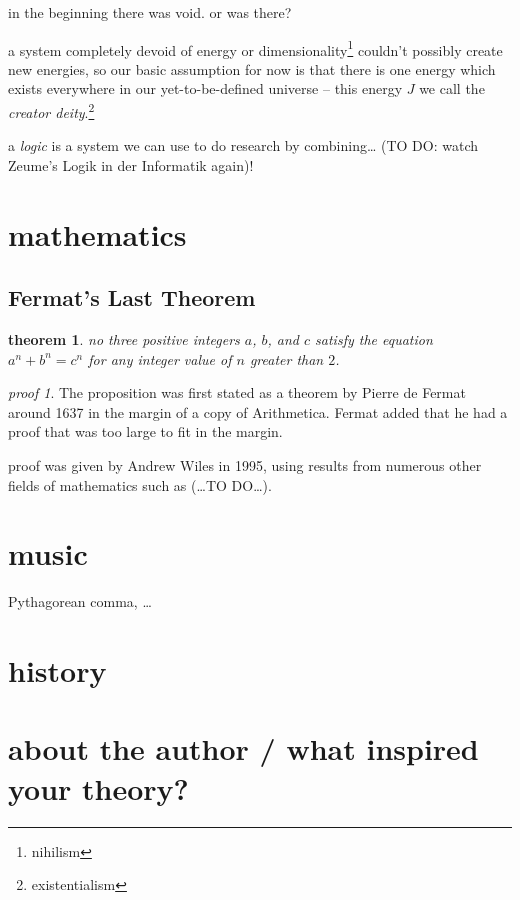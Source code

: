 \documentclass[12pt]{report}
\newtheorem*{thm}{theorem}
\theoremstyle{definition}
\theoremstyle{remark}
\newtheorem*{prf}{proof}
\begin{document}
in the beginning there was void. or was there?

a system completely devoid of energy or dimensionality\footnote{nihilism} couldn't possibly create new energies, so our basic assumption for now is that there is one energy which exists everywhere in our yet-to-be-defined universe -- this energy $J$ we call the \emph{creator deity}.\footnote{existentialism}

a \emph{logic} is a system we can use to do research by combining… (TO DO: watch Zeume's Logik in der Informatik again)!

\section{mathematics}

\subsection{Fermat's Last Theorem}

\begin{thm}
no three positive integers $a$, $b$, and $c$ satisfy the equation $a^n + b^n = c^n$ for any integer value of $n$ greater than $2$.\cite{w:flt}
\end{thm}

\begin{prf}
The proposition was first stated as a theorem by Pierre de Fermat around 1637 in the margin of a copy of Arithmetica. Fermat added that he had a proof that was too large to fit in the margin.\cite{w:flt}

proof was given by Andrew Wiles in 1995, using results from numerous other fields of mathematics such as (…TO DO…).
\end{prf}

\section{music}

Pythagorean comma, …

\section{history}


\appendix

\section{about the author / what inspired your theory?}
\end{document}

